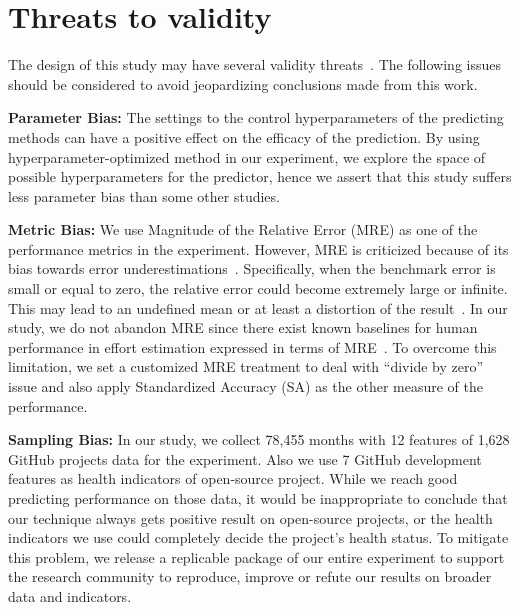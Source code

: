 \documentclass[sigconf,anonymous,review]{acmart}
\begin{document}
\section{Threats to validity}
\label{sect:threa}
The design of this study may have several validity threats~\cite{feldt2010validity}. The following issues should be considered to avoid jeopardizing conclusions made from this work.
 

\textbf{Parameter Bias:} The settings to the control hyperparameters of the predicting methods can have a positive effect on the efficacy of the prediction. By using hyperparameter-optimized method in our experiment, we explore the space of possible hyperparameters for the predictor, hence we assert that this study suffers less parameter bias than some other studies.

\textbf{Metric Bias:} We use Magnitude of the Relative Error (MRE) as one of the performance metrics in the experiment. However, MRE is criticized because of its bias towards error underestimations~\cite{foss2003simulation,kitchenham2001accuracy,korte2008confidence,port2008comparative,shepperd2000building,stensrud2003further}. Specifically, when the benchmark error is small or equal to zero, the relative error could become extremely large or infinite. This may lead to an undefined mean or at least a distortion of the result~\cite{chen2017new}. In our study, we do not abandon MRE since there exist known baselines for human performance in effort estimation expressed in terms of MRE~\cite{Jorgensen03}. To overcome this limitation, we set a customized MRE treatment to deal with ``divide by zero'' issue and also apply Standardized Accuracy (SA) as the other measure of the performance.

\textbf{Sampling Bias:} 
In our study, we collect 78,455 months with 12 features of 1,628 GitHub projects data for the experiment. Also we use 7 GitHub development features as health indicators of open-source project. While we reach good predicting performance on those data, it would be inappropriate to conclude that our technique always gets positive result on open-source projects, or the health indicators we use could completely decide the project's health status. To mitigate this problem, we release a replicable package of our entire experiment to support the research community to reproduce, improve or refute our results on broader data and indicators.

 

\end{document}
